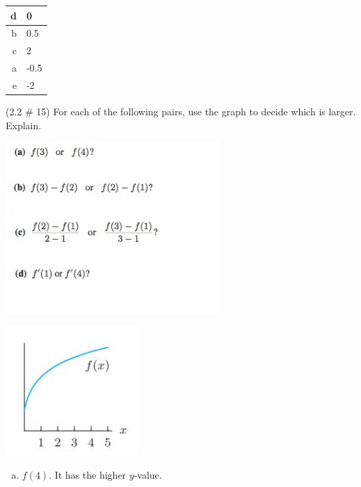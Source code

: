 \documentclass[11pt]{exam}
\begin{document}
\begin{questions}
         \begin{solution}
           \begin{tabular}{|r|l|}
             \hline
             d & 0\\
             \hline 
             b & 0.5\\
             \hline
             c & 2\\
             \hline
             a & -0.5\\
             \hline
             e & -2\\
             \hline
           \end{tabular}
         \end{solution}
\question (2.2 \# 15) For each of the following pairs, use the graph to decide which is larger.  Explain.\\
  \begin{minipage}{0.5\linewidth}
    \includegraphics[width=3.2in]{no15.jpg}
  \end{minipage}
  \begin{minipage}{0.5\linewidth}
    \includegraphics[width=2in]{no15graph.jpg}
  \end{minipage}
         \begin{solution}
           \begin{enumerate}[(a)]
           \item \(f(4)\). It has the higher \(y\)-value.

\end{enumerate}
\end{solution}
\end{questions}
\end{document}
